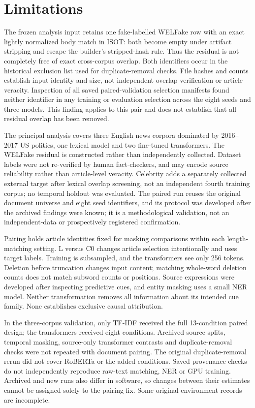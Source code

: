 \section{Limitations}
The frozen analysis input retains one fake-labelled WELFake row with an exact lightly normalized body match in ISOT: both become empty under artifact stripping and escape the builder's stripped-hash rule. Thus the residual is not completely free of exact cross-corpus overlap. Both identifiers occur in the historical exclusion list used for duplicate-removal checks. File hashes and counts establish input identity and size, not independent overlap verification or article veracity. Inspection of all saved paired-validation selection manifests found neither identifier in any training or evaluation selection across the eight seeds and three models. This finding applies to this pair and does not establish that all residual overlap has been removed.

The principal analysis covers three English news corpora dominated by 2016--2017 US politics, one lexical model and two fine-tuned transformers. The WELFake residual is constructed rather than independently collected. Dataset labels were not re-verified by human fact-checkers, and may encode source reliability rather than article-level veracity. Celebrity adds a separately collected external target after lexical overlap screening, not an independent fourth training corpus; no temporal holdout was evaluated. The paired run reuses the original document universe and eight seed identifiers, and its protocol was developed after the archived findings were known; it is a methodological validation, not an independent-data or prospectively registered confirmation.

Pairing holds article identities fixed for masking comparisons within each length-matching setting. L versus C0 changes article selection intentionally and uses target labels. Training is subsampled, and the transformers see only 256 tokens. Deletion before truncation changes input content; matching whole-word deletion counts does not match subword counts or positions. Source expressions were developed after inspecting predictive cues, and entity masking uses a small NER model. Neither transformation removes all information about its intended cue family. None establishes exclusive causal attribution.

In the three-corpus validation, only TF-IDF received the full 13-condition paired design; the transformers received eight conditions. Archived source splits, temporal masking, source-only transformer contrasts and duplicate-removal checks were not repeated with document pairing. The original duplicate-removal rerun did not cover RoBERTa or the added conditions. Saved provenance checks do not independently reproduce raw-text matching, NER or GPU training. Archived and new runs also differ in software, so changes between their estimates cannot be assigned solely to the pairing fix. Some original environment records are incomplete.

